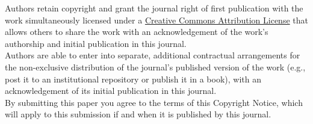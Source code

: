 \documentclass{jors}
\begin{document}
Authors retain copyright and grant the journal right of first publication with the work simultaneously licensed under a  \href{http://creativecommons.org/licenses/by/3.0/}{Creative Commons Attribution License} that allows others to share the work with an acknowledgement of the work's authorship and initial publication in this journal. \\

Authors are able to enter into separate, additional contractual arrangements for the non-exclusive distribution of the journal's published version of the work (e.g., post it to an institutional repository or publish it in a book), with an acknowledgement of its initial publication in this journal. \\

By submitting this paper you agree to the terms of this Copyright Notice, which will apply to this submission if and when it is published by this journal.
\end{document}

